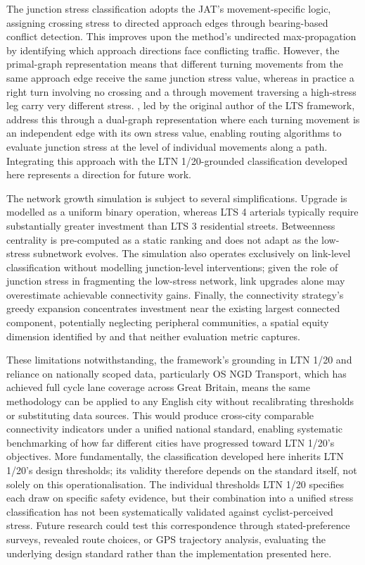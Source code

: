 The junction stress classification adopts the JAT's movement-specific logic, assigning crossing stress to directed approach edges through bearing-based conflict detection. This improves upon the \textcite{conveyal2015} method's undirected max-propagation by identifying which approach directions face conflicting traffic. However, the primal-graph representation means that different turning movements from the same approach edge receive the same junction stress value, whereas in practice a right turn involving no crossing and a through movement traversing a high-stress leg carry very different stress. \textcite{furth2026}, led by the original author of the LTS framework, address this through a dual-graph representation where each turning movement is an independent edge with its own stress value, enabling routing algorithms to evaluate junction stress at the level of individual movements along a path. Integrating this approach with the LTN 1/20-grounded classification developed here represents a direction for future work.

The network growth simulation is subject to several simplifications. Upgrade is modelled as a uniform binary operation, whereas LTS 4 arterials typically require substantially greater investment than LTS 3 residential streets. Betweenness centrality is pre-computed as a static ranking and does not adapt as the low-stress subnetwork evolves. The simulation also operates exclusively on link-level classification without modelling junction-level interventions; given the role of junction stress in fragmenting the low-stress network, link upgrades alone may overestimate achievable connectivity gains. Finally, the connectivity strategy's greedy expansion concentrates investment near the existing largest connected component, potentially neglecting peripheral communities, a spatial equity dimension identified by \textcite{szell2022} and \textcite{zhao2023} that neither evaluation metric captures.

These limitations notwithstanding, the framework's grounding in LTN 1/20 and reliance on nationally scoped data, particularly OS NGD Transport, which has achieved full cycle lane coverage across Great Britain, means the same methodology can be applied to any English city without recalibrating thresholds or substituting data sources. This would produce cross-city comparable connectivity indicators under a unified national standard, enabling systematic benchmarking of how far different cities have progressed toward LTN 1/20's objectives. More fundamentally, the classification developed here inherits LTN 1/20's design thresholds; its validity therefore depends on the standard itself, not solely on this operationalisation. The individual thresholds LTN 1/20 specifies each draw on specific safety evidence, but their combination into a unified stress classification has not been systematically validated against cyclist-perceived stress. Future research could test this correspondence through stated-preference surveys, revealed route choices, or GPS trajectory analysis, evaluating the underlying design standard rather than the implementation presented here.

